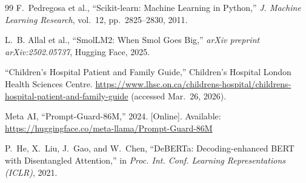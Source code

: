 \documentclass[pdflatex,sn-mathphys-num]{sn-jnl}%
\begin{document}
\begin{thebibliography}{99}
F.~Pedregosa et al., ``Scikit-learn: Machine Learning in Python,'' \textit{J. Machine Learning Research}, vol.~12, pp.~2825--2830, 2011.

L.~B. Allal et al., ``SmolLM2: When Smol Goes Big,'' \textit{arXiv preprint arXiv:2502.05737}, Hugging Face, 2025.

``Children's Hospital Patient and Family Guide,'' Children's Hospital London Health Sciences Centre. \url{https://www.lhsc.on.ca/childrens-hospital/childrens-hospital-patient-and-family-guide} (accessed Mar.\ 26, 2026).

Meta AI, ``Prompt-Guard-86M,'' 2024. [Online]. Available: \url{https://huggingface.co/meta-llama/Prompt-Guard-86M}

P.~He, X.~Liu, J.~Gao, and W.~Chen, ``DeBERTa: Decoding-enhanced BERT with Disentangled Attention,'' in \textit{Proc. Int. Conf. Learning Representations (ICLR)}, 2021.

\end{thebibliography}
\end{document}

